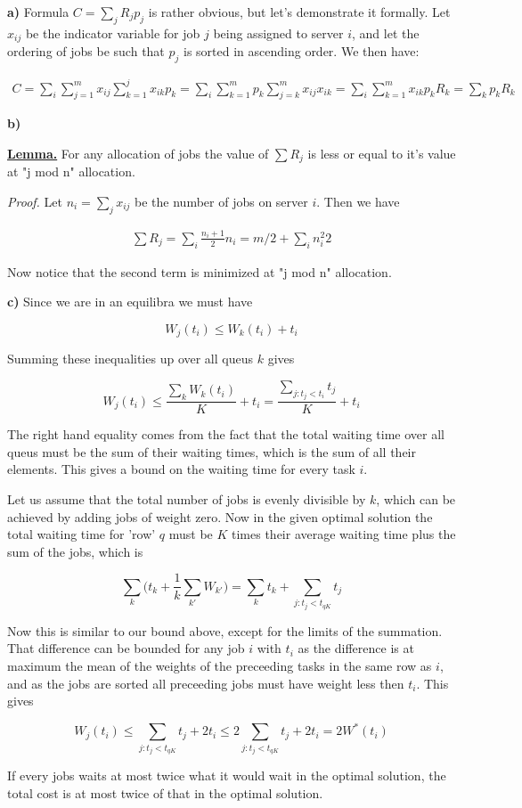 
\textbf{a)} Formula $C=\sum_j R_j p_j$ is rather obvious, but let's demonstrate it formally. Let $x_{ij}$ be the indicator variable for job $j$ being assigned to server $i$, and let the ordering of jobs be such that $p_j$ is sorted in ascending order. We then have:

\begin{align*}
C = \sum_i \sum_{j=1}^m x_{ij}\sum_{k=1}^j x_{ik}p_k = \sum_i \sum_{k=1}^m p_k \sum_{j=k}^m x_{ij}x_{ik} = \sum_i \sum_{k=1}^m x_{ik} p_k R_k = \sum_k p_k R_k
\end{align*}

\textbf{b)}

\uline{\textbf{Lemma.}} For any allocation of jobs the value of $\sum R_j$ is less or equal to it's value at "j mod n" allocation. 

\textit{Proof.} Let $n_i=\sum_j x_{ij}$ be the number of jobs on server $i$. Then we have

\begin{align*}
\sum R_j = \sum_i \frac{n_i+1}{2} n_i = m/2 + \sum_i {n_i^2}{2}
\end{align*}

Now notice that the second term is minimized at "j mod n" allocation. %

\textbf{c)} Since we are in an equilibra we must have

$$
W_j(t_i) \le W_k(t_i) + t_i
$$

Summing these inequalities up over all queus $k$ gives

$$
W_j(t_i) \le \frac{\sum_k W_k(t_i)}{K} + t_i = \frac{\sum_{j: t_j < t_i}  t_j}{K} + t_i 
$$

The right hand equality comes from the fact that the total waiting time over all queus must be the sum of their waiting times, which is the sum of all their elements. This gives a bound on the waiting time for every task $i$. 

Let us assume that the total number of jobs is evenly divisible by $k$, which can be achieved by adding jobs of weight zero. Now in the given optimal solution the total waiting time for 'row' $q$ must be $K$ times their average waiting time plus the sum of the jobs, which is

$$
\sum_k \bigg( t_k + \frac{1}{k} \sum_{k'} W_{k'} \bigg) = \sum_k t_k +  \sum_{j: t_j < t_{qK}}  t_j 
$$

Now this is similar to our bound above, except for the limits of the summation. That difference can be bounded for any job $i$ with $t_i$ as the difference is at maximum the mean of the weights of the preceeding tasks in the same row as $i$, and as the jobs are sorted all preceeding jobs must have weight less then $t_i$. This gives 

$$
W_j(t_i) \le \sum_{j: t_j < t_{qK}}  t_j  + 2 t_i \le 2 \sum_{j: t_j < t_{qK}}  t_j  + 2 t_i = 2 W^*(t_i)
$$

If every jobs waits at most twice what it would wait in the optimal solution, the total cost is at most twice of that in the optimal solution.